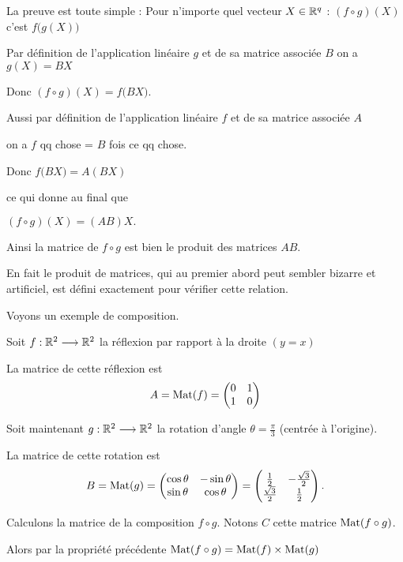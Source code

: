 \change
La preuve est toute simple :
Pour n'importe quel vecteur $X \in \mathbb{R}^q$ :
$(f \circ g)(X)$ c'est $f \big(g(X)\big)$

Par définition de l'application linéaire $g$ et de sa matrice associée $B$ on a
$g(X)=BX$

Donc $(f \circ g)(X)=f\big( BX \big)$.

Aussi par définition de l'application linéaire $f$ et de sa matrice associée $A$

on a $f$ qq chose = $B$ fois ce qq chose.

Donc $f\big( BX \big)= A(BX)$

ce qui donne au final que

$(f \circ g)(X)= (AB)X.$

Ainsi la matrice de $f \circ g$ est bien le produit des matrices $AB$.


En fait le produit de matrices, qui au premier abord peut sembler 
bizarre et artificiel, est défini exactement pour vérifier cette relation.


\diapo


Voyons un exemple de composition.

Soit $f: \mathbb{R}^2 \longrightarrow \mathbb{R}^2$ la réflexion par rapport à la droite 
$(y = x)$ 

\change
La matrice de cette réflexion est
$$ A = \mathop{\mathrm{Mat}}\nolimits(f) = \begin{pmatrix} 0 & 1 \\ 1 & 0 \end{pmatrix}$$

\change
Soit maintenant $g: \mathbb{R}^2 \longrightarrow \mathbb{R}^2$ 
la rotation d'angle $\theta=\frac\pi3$ (centrée à l'origine).

\change
La matrice de cette rotation est
$$B = \mathop{\mathrm{Mat}}\nolimits(g) =  
\begin{pmatrix}
\cos\theta & -\sin\theta\\
\sin\theta & \cos\theta
\end{pmatrix}
=
\begin{pmatrix} 
\frac12 & -\frac{\sqrt3}{2} \\  
\frac{\sqrt3}{2} & \frac12
\end{pmatrix}.
$$


\change
Calculons la matrice de la composition $f\circ g$.
Notons $C$ cette matrice 
$\mathop{\mathrm{Mat}}\nolimits (f\circ g)$.

Alors par la propriété précédente $\mathop{\mathrm{Mat}}\nolimits (f\circ g) = \mathop{\mathrm{Mat}}\nolimits (f) \times \mathop{\mathrm{Mat}}\nolimits (g)$

